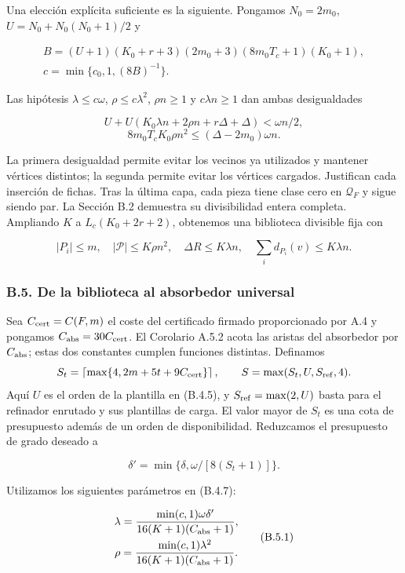 \documentclass[spanish,11pt,a4paper]{article}
\begin{document}
Una elección explícita suficiente es la siguiente. Pongamos \(N_0=2m_0\), \(U=N_0+N_0(N_0+1)/2\) y

\[\begin{gathered}
B=(U+1)(K_0+r+3)(2m_0+3)(8m_0T_c+1)(K_0+1),\\
c=\min\{c_0,1,(8B)^{-1}\}.
\end{gathered}
\tag{B.4.5}\]

Las hipótesis \(\lambda\le c\omega\), \(\rho\le c\lambda^2\), \(\rho n\ge1\) y \(c\lambda n\ge1\) dan ambas desigualdades

\[U+U(K_0\lambda n+2\rho n+r\Delta+\Delta)<\omega n/2,\] \[8m_0T_cK_0\rho n^2\le(\Delta-2m_0)\omega n.
\tag{B.4.6}\]

La primera desigualdad permite evitar los vecinos ya utilizados y mantener vértices distintos; la segunda permite evitar los vértices cargados. Justifican cada inserción de fichas. Tras la última capa, cada pieza tiene clase cero en \(\mathcal Q_F\) y sigue siendo par. La Sección B.2 demuestra su divisibilidad entera completa. Ampliando \(K\) a \(L_c(K_0+2r+2)\), obtenemos una biblioteca divisible fija con

\[|P_i|\le m,\quad |\mathcal P|\le K\rho n^2,\quad
\Delta R\le K\lambda n,\quad
\sum_i d_{P_i}(v)\le K\lambda n.
\tag{B.4.7}\]

\subsubsection{B.5. De la biblioteca al absorbedor universal}\label{b.5.-de-la-biblioteca-al-absorbedor-universal}

Sea \(C_{\rm cert}=C(F,m)\) el coste del certificado firmado proporcionado por A.4 y pongamos \(C_{\rm abs}=30C_{\rm cert}\). El Corolario A.5.2 acota las aristas del absorbedor por \(C_{\rm abs}\); estas dos constantes cumplen funciones distintas. Definamos \[S_t=\left\lceil\max\{4,2m+5t+9C_{\rm cert}\}\right\rceil,
\qquad S=\max(S_t,U,S_{\rm ref},4).\] Aquí \(U\) es el orden de la plantilla en (B.4.5), y \(S_{\rm ref}=\max(2,U)\) basta para el refinador enrutado y sus plantillas de carga. El valor mayor de \(S_t\) es una cota de presupuesto además de un orden de disponibilidad. Reduzcamos el presupuesto de grado deseado a

\[\delta'=\min\{\delta,\omega/[8(S_t+1)]\}.\]

Utilizamos los siguientes parámetros en (B.4.7):

\[\begin{gathered}
\lambda=\frac{\min(c,1)\omega\delta'}{16(K+1)(C_{\rm abs}+1)},\\
\rho=\frac{\min(c,1)\lambda^2}{16(K+1)(C_{\rm abs}+1)}.
\end{gathered}
\tag{B.5.1}\]
\end{document}
